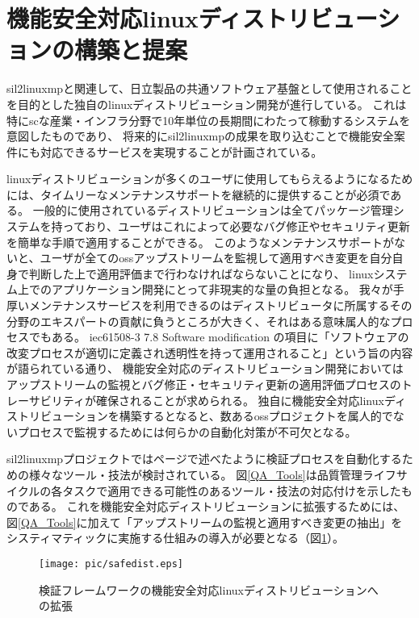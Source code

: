 \section{機能安全対応\acrshort{linux}ディストリビューションの構築と提案}
\acrshort{sil2linuxmp}と関連して、日立製品の共通ソフトウェア基盤として使用されることを目的とした独自の\acrshort{linux}ディストリビューション開発が進行している。
これは特に\acrshort{sc}な産業・インフラ分野で10年単位の長期間にわたって稼動するシステムを意図したものであり、
将来的に\acrshort{sil2linuxmp}の成果を取り込むことで機能安全案件にも対応できるサービスを実現することが計画されている。
\par
\acrshort{linux}ディストリビューションが多くのユーザに使用してもらえるようになるためには、タイムリーなメンテナンスサポートを継続的に提供することが必須である。
一般的に使用されているディストリビューションは全てパッケージ管理システムを持っており、ユーザはこれによって必要なバグ修正やセキュリティ更新を簡単な手順で適用することができる。
このようなメンテナンスサポートがないと、ユーザが全ての\acrshort{oss}アップストリームを監視して適用すべき変更を自分自身で判断した上で適用評価まで行わなければならないことになり、
\acrshort{linux}システム上でのアプリケーション開発にとって非現実的な量の負担となる。
我々が手厚いメンテナンスサービスを利用できるのはディストリビュータに所属するその分野のエキスパートの貢献に負うところが大きく、それはある意味属人的なプロセスでもある。
\acrshort{iec61508}-3 7.8 Software modification の項目に「ソフトウェアの改変プロセスが適切に定義され透明性を持って運用されること」という旨の内容が語られている通り、
機能安全対応のディストリビューション開発においてはアップストリームの監視とバグ修正・セキュリティ更新の適用評価プロセスのトレーサビリティが確保されることが求められる。
独自に機能安全対応\acrshort{linux}ディストリビューションを構築するとなると、数ある\acrshort{oss}プロジェクトを属人的でないプロセスで監視するためには何らかの自動化対策が不可欠となる。
\par
\acrshort{sil2linuxmp}プロジェクトでは\pageref{scale}ページで述べたように検証プロセスを自動化するための様々なツール・技法が検討されている。
図\ref{QA_Tools}は品質管理ライフサイクルの各タスクで適用できる可能性のあるツール・技法の対応付けを示したものである。
これを機能安全対応ディストリビューションに拡張するためには、図\ref{QA_Tools}に加えて「アップストリームの監視と適用すべき変更の抽出」をシスティマティックに実施する仕組みの導入が必要となる（図\ref{safedist}）。
\begin{figure}[ht]
  \centering
  \texttt{[image: pic/safedist.eps]}
  \caption{検証フレームワークの機能安全対応\acrshort{linux}ディストリビューションへの拡張}
  \label{safedist}
\end{figure}
